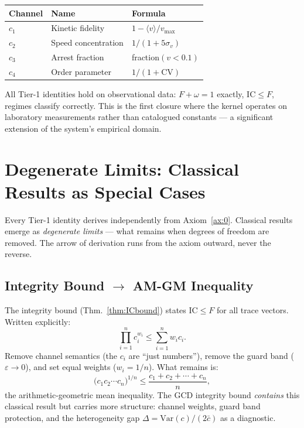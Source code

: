 \documentclass[
  aps,
  prd,
  preprint,
  superscriptaddress,
  nofootinbib,
  floatfix,
  longbibliography
]{revtex4-2}
\newcommand{\eps}{\varepsilon}
\newcommand{\beq}{\begin{equation}}
\newcommand{\eeq}{\end{equation}}
\newcommand{\IC}{\mathrm{IC}}
\newcommand{\Fid}{F}
\newcommand{\Drft}{\omega}
\newcommand{\hetgap}{\Delta}
\begin{document}
\begin{center}
\begin{tabular}{@{}llp{6cm}@{}}
\toprule
\textbf{Channel} & \textbf{Name} & \textbf{Formula} \\
\midrule
$c_1$ & Kinetic fidelity & $1 - \langle v \rangle / v_{\max}$ \\
$c_2$ & Speed concentration & $1/(1 + 5\sigma_v)$ \\
$c_3$ & Arrest fraction & fraction$(v < 0.1)$ \\
$c_4$ & Order parameter & $1/(1 + \mathrm{CV})$ \\
\bottomrule
\end{tabular}
\end{center}

All Tier-1 identities hold on observational data:
$\Fid + \Drft = 1$ exactly, $\IC \leq \Fid$, regimes
classify correctly.
This is the first closure where the kernel operates on
laboratory measurements rather than catalogued constants —
a significant extension of the system's empirical domain.

\section{Degenerate Limits: Classical Results as
         Special Cases}\label{sec:degenerate}

Every Tier-1 identity derives independently from
Axiom~\ref{ax:0}.
Classical results emerge as \emph{degenerate limits} —
what remains when degrees of freedom are removed.
The arrow of derivation runs from the axiom outward,
never the reverse.

\subsection{Integrity Bound $\to$ AM-GM Inequality}

The integrity bound (Thm.~\ref{thm:ICbound}) states
$\IC \leq \Fid$ for all trace vectors.
Written explicitly:
\beq
  \prod_{i=1}^{n} c_i^{w_i} \leq \sum_{i=1}^{n} w_i c_i.
\eeq
Remove channel semantics (the $c_i$ are ``just numbers''),
remove the guard band ($\eps \to 0$), and set equal
weights ($w_i = 1/n$).
What remains is:
\beq
  \bigl(c_1 c_2 \cdots c_n\bigr)^{1/n}
  \leq \frac{c_1 + c_2 + \cdots + c_n}{n},
\eeq
the arithmetic-geometric mean inequality.
The GCD integrity bound \emph{contains} this classical
result but carries more structure: channel weights,
guard band protection, and the heterogeneity gap
$\hetgap = \mathrm{Var}(c)/(2\bar{c})$ as a diagnostic.
\end{document}
